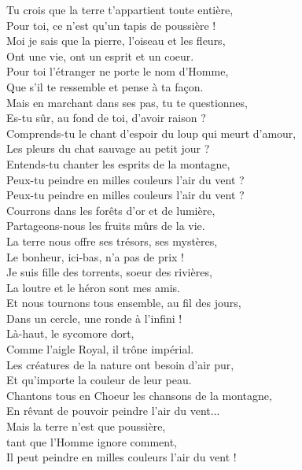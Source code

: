 \documentclass{novel}
\begin{document}
Tu crois que la terre t'appartient toute entière, \\
Pour toi, ce n'est qu'un tapis de poussière ! \\
Moi je sais que la pierre, l'oiseau et les fleurs, \\
Ont une vie, ont un esprit et un coeur. \\

Pour toi l'étranger ne porte le nom d'Homme, \\
Que s'il te ressemble et pense à ta façon. \\
Mais en marchant dans ses pas, tu te questionnes, \\
Es-tu sûr, au fond de toi, d'avoir raison ? \\

Comprends-tu le chant d'espoir du loup qui meurt d'amour, \\
Les pleurs du chat sauvage au petit jour ? \\
Entends-tu chanter les esprits de la montagne, \\
Peux-tu peindre en milles couleurs l'air du vent ? \\
Peux-tu peindre en milles couleurs l'air du vent ? \\

Courrons dans les forêts d'or et de lumière, \\
Partageons-nous les fruits mûrs de la vie. \\
La terre nous offre ses trésors, ses mystères, \\
Le bonheur, ici-bas, n'a pas de prix ! \\

Je suis fille des torrents, soeur des rivières, \\
La loutre et le héron sont mes amis. \\
Et nous tournons tous ensemble, au fil des jours, \\
Dans un cercle, une ronde à l'infini ! \\

Là-haut, le sycomore dort, \\
Comme l'aigle Royal, il trône impérial. \\
Les créatures de la nature ont besoin d'air pur, \\
Et qu'importe la couleur de leur peau. \\

Chantons tous en Choeur les chansons de la montagne, \\
En rêvant de pouvoir peindre l'air du vent... \\
Mais la terre n'est que poussière, \\
tant que l'Homme ignore comment, \\
Il peut peindre en milles couleurs l'air du vent ! \\
\end{document}
